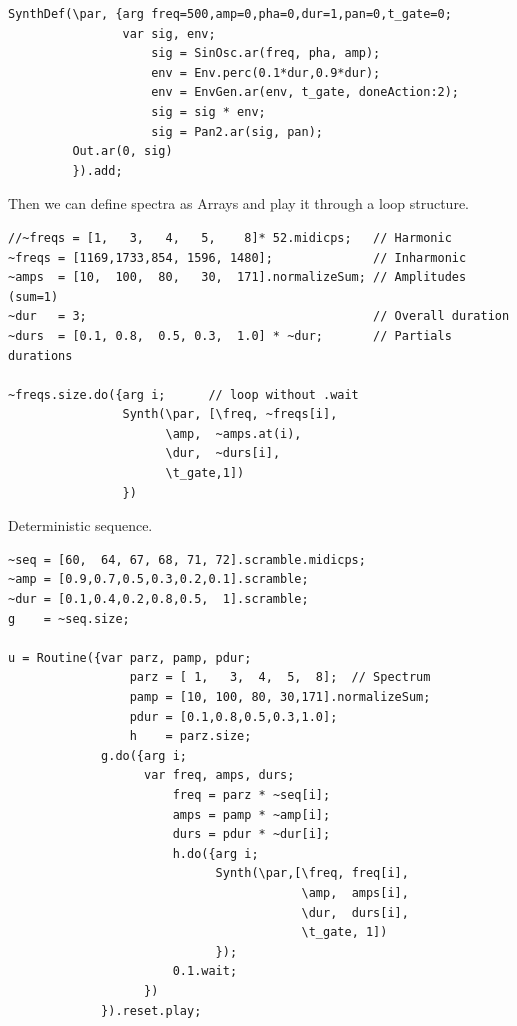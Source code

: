 \begin{lstlisting}[frame=single, caption=Partial model] 
SynthDef(\par, {arg freq=500,amp=0,pha=0,dur=1,pan=0,t_gate=0;
                var sig, env;
                    sig = SinOsc.ar(freq, pha, amp);      
                    env = Env.perc(0.1*dur,0.9*dur);
                    env = EnvGen.ar(env, t_gate, doneAction:2);
                    sig = sig * env;
                    sig = Pan2.ar(sig, pan);
         Out.ar(0, sig)
         }).add;
\end{lstlisting}

Then we can define spectra as Arrays and play it through a loop structure.

\begin{lstlisting}[frame=single] 
//~freqs = [1,   3,   4,   5,    8]* 52.midicps;   // Harmonic
~freqs = [1169,1733,854, 1596, 1480];              // Inharmonic
~amps  = [10,  100,  80,   30,  171].normalizeSum; // Amplitudes (sum=1)
~dur   = 3;                                        // Overall duration
~durs  = [0.1, 0.8,  0.5, 0.3,  1.0] * ~dur;       // Partials durations              

~freqs.size.do({arg i;      // loop without .wait
                Synth(\par, [\freq, ~freqs[i],
                      \amp,  ~amps.at(i),
                      \dur,  ~durs[i],
                      \t_gate,1])
                })
\end{lstlisting}

Deterministic sequence.

\begin{lstlisting}[frame=single] 
~seq = [60,  64, 67, 68, 71, 72].scramble.midicps;
~amp = [0.9,0.7,0.5,0.3,0.2,0.1].scramble;
~dur = [0.1,0.4,0.2,0.8,0.5,  1].scramble;
g    = ~seq.size;

u = Routine({var parz, pamp, pdur;
                 parz = [ 1,   3,  4,  5,  8];  // Spectrum
                 pamp = [10, 100, 80, 30,171].normalizeSum;
                 pdur = [0.1,0.8,0.5,0.3,1.0]; 
                 h    = parz.size;
             g.do({arg i;
                   var freq, amps, durs;
                       freq = parz * ~seq[i];   
                       amps = pamp * ~amp[i];
                       durs = pdur * ~dur[i];
                       h.do({arg i;
                             Synth(\par,[\freq, freq[i],
                                         \amp,  amps[i],
                                         \dur,  durs[i],
                                         \t_gate, 1])
                             });
                       0.1.wait;              
                   })
             }).reset.play;
\end{lstlisting}

